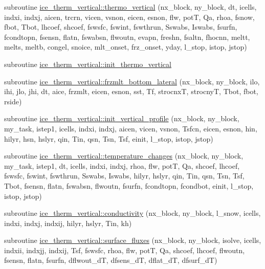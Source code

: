 \begin{DoxyCompactItemize}
\item 
subroutine \hyperlink{namespaceice__therm__vertical_a6a3853686daba96faa929c71f0a65cd6}{ice\_\-therm\_\-vertical::thermo\_\-vertical} (nx\_\-block, ny\_\-block, dt, icells, indxi, indxj, aicen, trcrn, vicen, vsnon, eicen, esnon, flw, potT, Qa, rhoa, fsnow, fbot, Tbot, lhcoef, shcoef, fswsfc, fswint, fswthrun, Sswabs, Iswabs, fsurfn, fcondtopn, fsensn, flatn, fswabsn, flwoutn, evapn, freshn, fsaltn, fhocnn, meltt, melts, meltb, congel, snoice, mlt\_\-onset, frz\_\-onset, yday, l\_\-stop, istop, jstop)
\item 
subroutine \hyperlink{namespaceice__therm__vertical_a1123b2b5ee24c8b82a26c5a831c88405}{ice\_\-therm\_\-vertical::init\_\-thermo\_\-vertical}
\item 
subroutine \hyperlink{namespaceice__therm__vertical_ae86ac5bb13d456664da2d8a1aae2f80c}{ice\_\-therm\_\-vertical::frzmlt\_\-bottom\_\-lateral} (nx\_\-block, ny\_\-block, ilo, ihi, jlo, jhi, dt, aice, frzmlt, eicen, esnon, sst, Tf, strocnxT, strocnyT, Tbot, fbot, rside)
\item 
subroutine \hyperlink{namespaceice__therm__vertical_a9e8915673a763c6533b1bf688775f02c}{ice\_\-therm\_\-vertical::init\_\-vertical\_\-profile} (nx\_\-block, ny\_\-block, my\_\-task, istep1, icells, indxi, indxj, aicen, vicen, vsnon, Tsfcn, eicen, esnon, hin, hilyr, hsn, hslyr, qin, Tin, qsn, Tsn, Tsf, einit, l\_\-stop, istop, jstop)
\item 
subroutine \hyperlink{namespaceice__therm__vertical_afe7e9128dd994fd74827b779ddeaf789}{ice\_\-therm\_\-vertical::temperature\_\-changes} (nx\_\-block, ny\_\-block, my\_\-task, istep1, dt, icells, indxi, indxj, rhoa, flw, potT, Qa, shcoef, lhcoef, fswsfc, fswint, fswthrun, Sswabs, Iswabs, hilyr, hslyr, qin, Tin, qsn, Tsn, Tsf, Tbot, fsensn, flatn, fswabsn, flwoutn, fsurfn, fcondtopn, fcondbot, einit, l\_\-stop, istop, jstop)
\item 
subroutine \hyperlink{namespaceice__therm__vertical_aeeb37e6f39ffa2d7269ac471d047a789}{ice\_\-therm\_\-vertical::conductivity} (nx\_\-block, ny\_\-block, l\_\-snow, icells, indxi, indxj, indxij, hilyr, hslyr, Tin, kh)
\item 
subroutine \hyperlink{namespaceice__therm__vertical_aa2320460f9c52d821db02db2209fa888}{ice\_\-therm\_\-vertical::surface\_\-fluxes} (nx\_\-block, ny\_\-block, isolve, icells, indxii, indxjj, indxij, Tsf, fswsfc, rhoa, flw, potT, Qa, shcoef, lhcoef, flwoutn, fsensn, flatn, fsurfn, dflwout\_\-dT, dfsens\_\-dT, dflat\_\-dT, dfsurf\_\-dT)

\end{DoxyCompactItemize}
